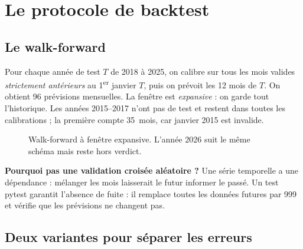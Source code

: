 \documentclass[11pt,a4paper]{article}
\begin{document}
\section{Le protocole de backtest}

\subsection{Le walk-forward}

Pour chaque année de test $T$ de 2018 à 2025, on calibre sur tous les mois valides \emph{strictement antérieurs} au 1\textsuperscript{er} janvier $T$, puis on prévoit les 12 mois de $T$.
On obtient 96 prévisions mensuelles. La fenêtre est \emph{expansive} : on garde tout l'historique. Les années 2015--2017 n'ont pas de test et restent dans toutes les calibrations ; la première compte 35~mois, car janvier 2015 est invalide.

\begin{figure}[ht]
\centering
{}
\caption{Walk-forward à fenêtre expansive. L'année 2026 suit le même schéma mais reste hors verdict.}
\end{figure}

\textbf{Pourquoi pas une validation croisée aléatoire ?} Une série temporelle a une dépendance : mélanger les mois laisserait le futur informer le passé. Un test pytest garantit l'absence de fuite :
il remplace toutes les données futures par 999 et vérifie que les prévisions ne changent pas.

\subsection{Deux variantes pour séparer les erreurs}
\end{document}
